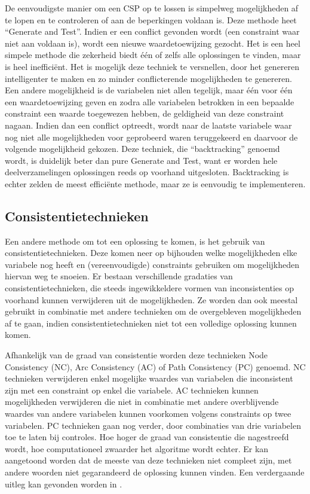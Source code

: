 De eenvoudigste manier om een CSP op te lossen is simpelweg mogelijkheden af te lopen en te controleren of aan de beperkingen voldaan is. Deze methode heet ``Generate and Test''. Indien er een conflict gevonden wordt (een constraint waar niet aan voldaan is), wordt een nieuwe waardetoewijzing gezocht.
Het is een heel simpele methode die zekerheid biedt \'e\'en of zelfs alle oplossingen te vinden, maar is heel ineffici\"ent. Het is mogelijk deze techniek te versnellen, door het genereren intelligenter te maken en zo minder conflicterende mogelijkheden te genereren. Een andere mogelijkheid is de variabelen niet allen tegelijk, maar \'e\'en voor \'e\'en een waardetoewijzing geven en zodra alle variabelen betrokken in een bepaalde constraint een waarde toegewezen hebben, de geldigheid van deze constraint nagaan. Indien dan een conflict optreedt, wordt naar de laatste variabele waar nog niet alle mogelijkheden voor geprobeerd waren teruggekeerd en daarvoor de volgende mogelijkheid gekozen. Deze techniek, die ``backtracking'' genoemd wordt, is duidelijk beter dan pure Generate and Test, want er worden hele deelverzamelingen oplossingen reeds op voorhand uitgesloten. Backtracking is echter zelden de meest effici\"ente methode, maar ze is eenvoudig te implementeren.

\subsection{Consistentietechnieken}

Een andere methode om tot een oplossing te komen, is het gebruik van consistentietechnieken. Deze komen neer op bijhouden welke mogelijkheden elke variabele nog heeft en (vereenvoudigde) constraints gebruiken om mogelijkheden hiervan weg te snoeien. Er bestaan verschillende gradaties van consistentietechnieken, die steeds ingewikkeldere vormen van inconsistenties op voorhand kunnen verwijderen uit de mogelijkheden. Ze worden dan ook meestal gebruikt in combinatie met andere technieken om de overgebleven mogelijkheden af te gaan, indien consistentietechnieken niet tot een volledige oplossing kunnen komen.

Afhankelijk van de graad van consistentie worden deze technieken Node Consistency (NC), Arc Consistency (AC) of Path Consistency (PC) genoemd. NC technieken verwijderen enkel mogelijke waardes van variabelen die inconsistent zijn met een constraint op enkel die variabele. AC technieken kunnen mogelijkheden verwijderen die niet in combinatie met andere overblijvende waardes van andere variabelen kunnen voorkomen volgens constraints op twee variabelen. PC technieken gaan nog verder, door combinaties van drie variabelen toe te laten bij controles. Hoe hoger de graad van consistentie die nagestreefd wordt, hoe computationeel zwaarder het algoritme wordt echter. Er kan aangetoond worden dat de meeste van deze technieken niet compleet zijn, met andere woorden niet gegarandeerd de oplossing kunnen vinden. Een verdergaande uitleg kan gevonden worden in \cite{bartak01}. 

